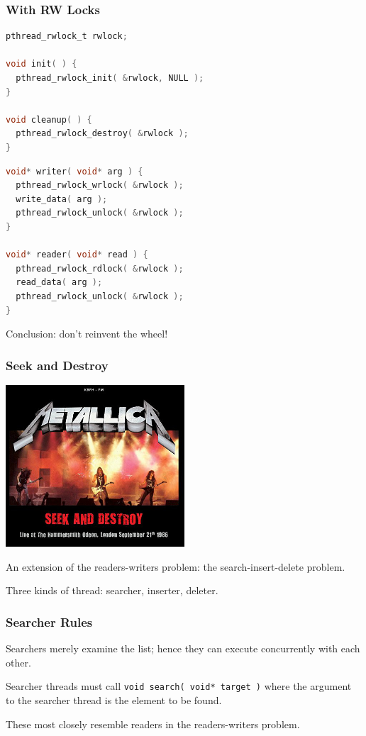 \begin{frame}[fragile]
\frametitle{With RW Locks}

\begin{multicols}{2}
\begin{lstlisting}[language=C]
pthread_rwlock_t rwlock;

void init( ) {
  pthread_rwlock_init( &rwlock, NULL );
}

void cleanup( ) {
  pthread_rwlock_destroy( &rwlock );
}
\end{lstlisting}

\columnbreak

\begin{lstlisting}[language=C]
void* writer( void* arg ) {
  pthread_rwlock_wrlock( &rwlock );
  write_data( arg );
  pthread_rwlock_unlock( &rwlock );
}

void* reader( void* read ) {
  pthread_rwlock_rdlock( &rwlock );
  read_data( arg );
  pthread_rwlock_unlock( &rwlock );
}
\end{lstlisting}

\end{multicols}

Conclusion: don't reinvent the wheel!

\end{frame}


\begin{frame}
\frametitle{Seek and Destroy}

\begin{center}
	\includegraphics[width=0.5\textwidth]{images/seek-and-destroy.jpg}
\end{center}
An extension of the readers-writers problem: the search-insert-delete problem.

Three kinds of thread: searcher, inserter, deleter.

\end{frame}


\begin{frame}
\frametitle{Searcher Rules}

\alert{Searchers} merely examine the list; hence they can execute concurrently with each other.

Searcher threads must call \texttt{void search( void* target )} where the argument to the searcher thread is the element to be found. 

These most closely resemble readers in the readers-writers problem.

\end{frame}

